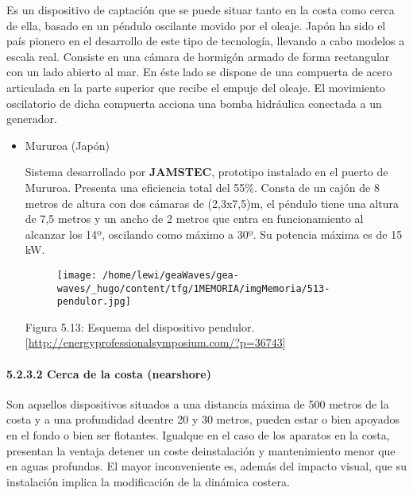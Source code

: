 \begin{itemize}
  Es un dispositivo de captación que se puede situar tanto en la costa
  como cerca de ella, basado en un péndulo oscilante movido por el
  oleaje. Japón ha sido el país pionero en el desarrollo de este tipo de
  tecnología, llevando a cabo modelos a escala real. Consiste en una
  cámara de hormigón armado de forma rectangular con un lado abierto al
  mar. En éste lado se dispone de una compuerta de acero articulada en
  la parte superior que recibe el empuje del oleaje. El movimiento
  oscilatorio de dicha compuerta acciona una bomba hidráulica conectada
  a un generador.

  \begin{itemize}
  \item
    Mururoa (Japón)

    Sistema desarrollado por \textbf{JAMSTEC}, prototipo instalado en el
    puerto de Mururoa. Presenta una eficiencia total del 55\%. Consta de
    un cajón de 8 metros de altura con dos cámaras de (2,3x7,5)m, el
    péndulo tiene una altura de 7,5 metros y un ancho de 2 metros que
    entra en funcionamiento al alcanzar los 14º, oscilando como máximo a
    30º. Su potencia máxima es de 15 kW.

    \begin{figure}
    \centering
    \texttt{[image: /home/lewi/geaWaves/gea-waves/\_hugo/content/tfg/1MEMORIA/imgMemoria/513-pendulor.jpg]}
    \caption{}
    \end{figure}

    Figura 5.13: Esquema del dispositivo pendulor.
    {[}\url{http://energyprofessionalsymposium.com/?p=36743}{]} 
  \end{itemize}
\end{itemize}

\paragraph{5.2.3.2 Cerca de la costa (nearshore)}\label{header-n228}

Son aquellos dispositivos situados a una distancia máxima de 500 metros
de la costa y a una profundidad deentre 20 y 30 metros, pueden estar o
bien apoyados en el fondo o bien ser flotantes. Igualque en el caso de
los aparatos en la costa, presentan la ventaja detener un coste
deinstalación y mantenimiento menor que en aguas profundas. El mayor
inconveniente es, además del impacto visual, que su instalación implica
la modificación de la dinámica costera.

